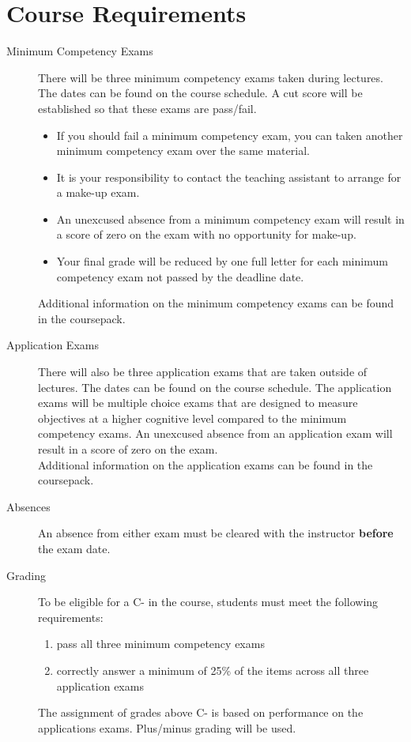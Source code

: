 \documentclass[11pt,article,oneside]{memoir}
\newcounter{schedule}
\begin{document}
\section*{Course Requirements}
\begin{description}
\item[Minimum Competency Exams] There will be three minimum competency exams taken during lectures. The dates can be found on the course schedule. A cut score will be established so that these exams are pass/fail. 
  \begin{itemize}
    \item If you should fail a minimum competency exam, you can taken another minimum competency exam over the same material.
    \item It is your responsibility to contact the teaching assistant to arrange for a make-up exam.
    \item An unexcused absence from a minimum competency exam will result in a score of zero on the exam with no opportunity for make-up.
    \item Your final grade will be reduced by one full letter for each minimum competency exam not passed by the deadline date.
  \end{itemize}
  Additional information on the minimum competency exams can be found in the coursepack.
\item[Application Exams] There will also be three application exams that are taken outside of lectures. The dates can be found on the course schedule. The application exams will be multiple choice exams that are designed to measure objectives at a higher cognitive level compared to the minimum competency exams. An unexcused absence from an application exam will result in a score of zero on the exam. \\
Additional information on the application exams can be found in the coursepack.
\item[Absences] An absence from either exam must be cleared with the instructor \textbf{before} the exam date. 
\item[Grading] To be eligible for a C- in the course, students must meet the following requirements:
  \begin{enumerate}[label={(\alph*)}]
   \item pass all three minimum competency exams
   \item correctly answer a minimum of 25\% of the items across all three application exams
  \end{enumerate}
  The assignment of grades above C- is based on performance on the applications exams. Plus/minus grading will be used.
\end{description}
\end{document}

